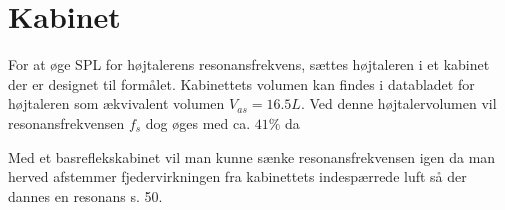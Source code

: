 \section{Kabinet}

For at øge SPL for højtalerens resonansfrekvens, sættes højtaleren i et kabinet der er designet til formålet.
Kabinettets volumen kan findes i databladet for højtaleren som ækvivalent volumen $V_{as} = 16.5L$. Ved denne højtalervolumen vil resonansfrekvensen $f_s$ dog øges med ca. $41\%$ da 

Med et basreflekskabinet vil man kunne sænke resonansfrekvensen igen da man herved afstemmer fjedervirkningen fra kabinettets indespærrede luft så der dannes en resonans \cite{Elektroakustik} s. 50. 